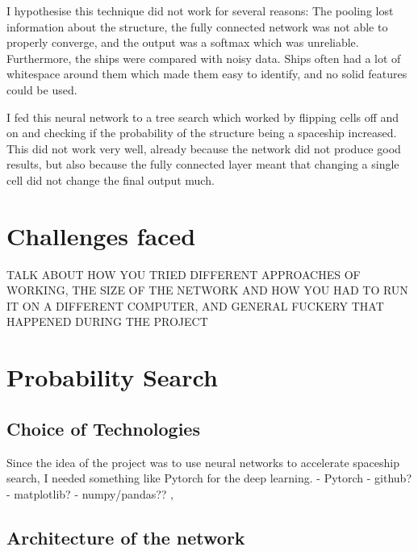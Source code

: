 \documentclass{l4proj}
\begin{document}
I hypothesise this technique did not work for several reasons: The pooling lost information about the structure, the fully connected network was not able to properly converge, and the output was a softmax which was unreliable. Furthermore, the ships were compared with noisy data. Ships often had a lot of whitespace around them which made them easy to identify, and no solid features could be used.

I fed this neural network to a tree search which worked by flipping cells off and on and checking if the probability of the structure being a spaceship increased. This did not work very well, already because the network did not produce good results, but also because the fully connected layer meant that changing a single cell did not change the final output much.

\section{Challenges faced}

TALK ABOUT HOW YOU TRIED DIFFERENT APPROACHES OF WORKING, THE SIZE OF THE NETWORK AND HOW YOU HAD TO RUN IT ON A DIFFERENT COMPUTER, AND GENERAL FUCKERY THAT HAPPENED DURING THE PROJECT

\section{Probability Search}

\subsection{Choice of Technologies}

Since the idea of the project was to use neural networks to accelerate spaceship search, I needed something like Pytorch for the deep learning.
- Pytorch
- github?
- matplotlib?
- numpy/pandas??
,

\subsection{Architecture of the network}
\end{document}
